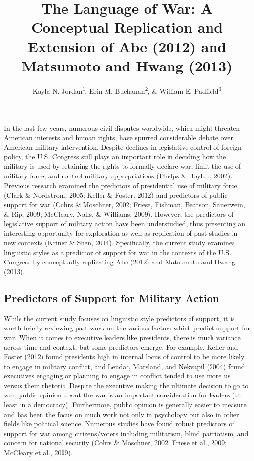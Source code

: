 \documentclass[english,,man]{apa6}
\title{The Language of War: A Conceptual Replication and Extension of Abe (2012) and Matsumoto and Hwang (2013)}
\author{Kayla N. Jordan\textsuperscript{1}, Erin M. Buchanan\textsuperscript{2}, \& William E. Padfield\textsuperscript{3}}
\date{}
\affiliation{\vspace{0.5cm}\textsuperscript{1} University of Texas - Austin\\\textsuperscript{2} Harrisburg University of Science and Technology\\\textsuperscript{3} Missouri State University}
\begin{document}
\maketitle

In the last few years, numerous civil disputes worldwide, which might threaten American interests and human rights, have spurred considerable debate over American military intervention. Despite declines in legislative control of foreign policy, the U.S. Congress still plays an important role in deciding how the military is used by retaining the rights to formally declare war, limit the use of military force, and control military appropriations (Phelps \& Boylan, 2002). Previous research examined the predictors of presidential use of military force (Clark \& Nordstrom, 2005; Keller \& Foster, 2012) and predictors of public support for war (Cohrs \& Moschner, 2002; Friese, Fishman, Beatson, Sauerwein, \& Rip, 2009; McCleary, Nalls, \& Williams, 2009). However, the predictors of legislative support of military action have been understudied, thus presenting an interesting opportunity for exploration as well as replication of past studies in new contexts (Kriner \& Shen, 2014). Specifically, the current study examines linguistic styles as a predictor of support for war in the contexts of the U.S. Congress by conceptually replicating Abe (2012) and Matsumoto and Hwang (2013).

\hypertarget{predictors-of-support-for-military-action}{%
\subsection{Predictors of Support for Military Action}\label{predictors-of-support-for-military-action}}

While the current study focuses on linguistic style predictors of support, it is worth briefly reviewing past work on the various factors which predict support for war. When it comes to executive leaders like presidents, there is much variance across time and context, but some predictors emerge. For example, Keller and Foster (2012) found presidents high in internal locus of control to be more likely to engage in military conflict, and Leudar, Marsland, and Nekvapil (2004) found executives engaging or planning to engage in conflict tended to use more us versus them rhetoric. Despite the executive making the ultimate decision to go to war, public opinion about the war is an important consideration for leaders (at least in a democracy). Furthermore, public opinion is generally easier to measure and has been the focus on much work not only in psychology but also in other fields like political science. Numerous studies have found robust predictors of support for war among citizens/voters including militarism, blind patriotism, and concern for national security (Cohrs \& Moschner, 2002; Friese et al., 2009; McCleary et al., 2009).
\end{document}

